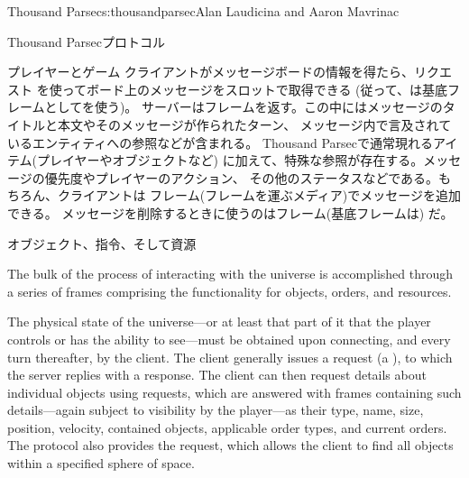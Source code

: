 \begin{aosachapter}{Thousand Parsec}{s:thousandparsec}{Alan Laudicina and Aaron Mavrinac}
\begin{aosasect1}{Thousand Parsecプロトコル}
\begin{aosasect2}{プレイヤーとゲーム}
クライアントがメッセージボードの情報を得たら、リクエスト
を使ってボード上のメッセージをスロットで取得できる
(従って、は基底フレームとしてを使う)。
サーバーはフレームを返す。この中にはメッセージのタイトルと本文やそのメッセージが作られたターン、
メッセージ内で言及されているエンティティへの参照などが含まれる。
Thousand Parsecで通常現れるアイテム(プレイヤーやオブジェクトなど)
に加えて、特殊な参照が存在する。メッセージの優先度やプレイヤーのアクション、
その他のステータスなどである。もちろん、クライアントは
フレーム(フレームを運ぶメディア)でメッセージを追加できる。
メッセージを削除するときに使うのはフレーム(基底フレームは)
だ。

\end{aosasect2}

\begin{aosasect2}{オブジェクト、指令、そして資源}

The bulk of the process of interacting with the universe is
accomplished through a series of frames comprising the functionality
for objects, orders, and resources.

The physical state of the universe---or at least that part of it that
the player controls or has the ability to see---must be obtained upon
connecting, and every turn thereafter, by the client. The client
generally issues a  request (a ), to which the server replies with a  response. The client can then request details about individual
objects using  requests, which are answered
with  frames containing such details---again subject to
visibility by the player---as their type, name, size, position,
velocity, contained objects, applicable order types, and current
orders. The protocol also provides the  request, which allows the client to find all objects
within a specified sphere of space.


\end{aosasect2}
\end{aosasect1}
\end{aosachapter}
